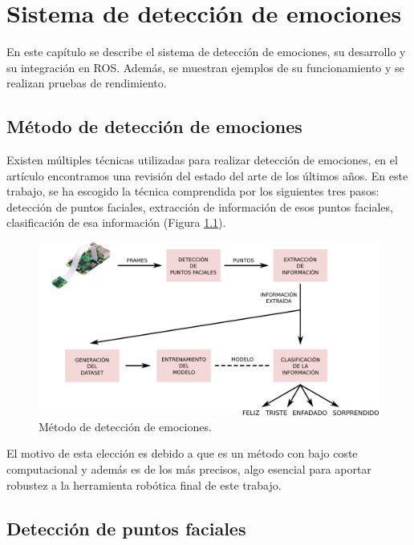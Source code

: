 \chapter{Sistema de detección de emociones}
\label{cap:capitulo4}

En este capítulo se describe el sistema de detección de emociones, su desarrollo y su integración en ROS. Además, se muestran ejemplos de su funcionamiento y se realizan pruebas de rendimiento.

\section{Método de detección de emociones}
\label{sec:metodo}

Existen múltiples técnicas utilizadas para realizar detección de emociones, en el artículo \cite{literature_review} encontramos una revisión del estado del arte de los últimos años. En este trabajo, se ha escogido la técnica comprendida por los siguientes tres pasos: detección de puntos faciales, extracción de información de esos puntos faciales, clasificación de esa información (Figura \ref{fig:metodo}).\\

\begin{figure} [h!]
  \begin{center}
    \includegraphics[width=16cm]{figs/metodo.png}
  \end{center}
  \captionsetup{justification=centering}
  \caption{Método de detección de emociones.}
  \label{fig:metodo}
\end{figure}

El motivo de esta elección es debido a que es un método con bajo coste computacional y además es de los más precisos, algo esencial para aportar robustez a la herramienta robótica final de este trabajo.

\section{Detección de puntos faciales}
\label{sec:deteccion_de puntos}

